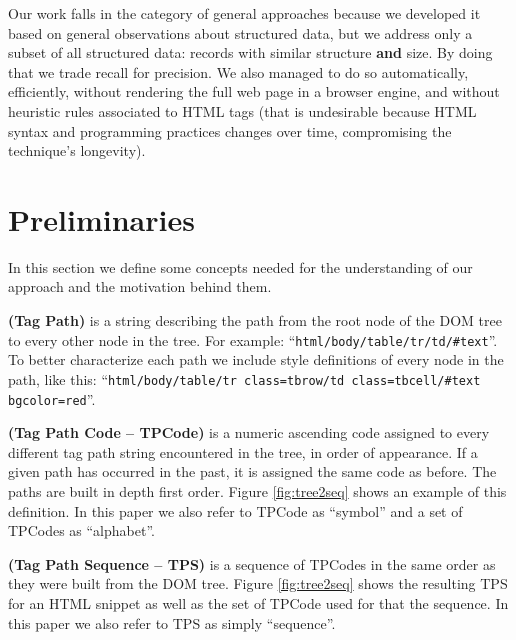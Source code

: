 \documentclass{vldb}
\begin{document}
Our work falls in the category of general approaches because we developed it
based on general observations about structured data, but we address only a
subset of all structured data: records with similar structure \textbf{and} size.
By doing that we trade recall for precision. We also managed to do so
automatically, efficiently, without rendering the full web page in a browser
engine, and without heuristic rules associated to HTML tags (that is undesirable
because HTML syntax and programming practices changes over time, compromising
the technique's longevity).

\section{Preliminaries}\label{sec:defs}
In this section we define some concepts needed for the understanding of our
approach and the motivation behind them.

\begin{definition}\textbf{(Tag Path)} is a string describing the path from the
root node of the DOM tree to every other node in the tree. For example:
``\texttt{html/body/table/tr/td/\#text}''. To better characterize each path we
include style definitions of every node in the path, like this:
``\texttt{html/body/table/tr class=tbrow/td class=tbcell/\#text bgcolor=red}''.
\end{definition}

\begin{definition}\textbf{(Tag Path Code -- TPCode)}\label{def:tpc} is a numeric
ascending code assigned to every different tag path string encountered in the
tree, in order of appearance. If a given path has occurred in the past, it is
assigned the same code as before. The paths are built in depth first order.
Figure \ref{fig:tree2seq} shows an example of this definition. In this paper we
also refer to TPCode as ``symbol'' and a set of TPCodes as ``alphabet''.
\end{definition}

\begin{definition}\textbf{(Tag Path Sequence -- TPS)} is a sequence of TPCodes
in the same order as they were built from the DOM tree. Figure \ref{fig:tree2seq} shows
the resulting TPS for an HTML snippet as  well as the set of TPCode used for that
the sequence. In this paper we also refer to TPS as simply ``sequence''.
\end{definition}
\end{document}
